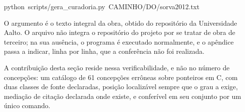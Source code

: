\begin{center}\small\ttfamily
python~scripts/gera\_curadoria.py~CAMINHO/DO/sorva2012.txt
\end{center}

O argumento é o texto integral da obra, obtido do repositório da Universidade Aalto. O arquivo não integra o repositório do projeto por se tratar de obra de terceiro; na sua ausência, o programa é executado normalmente, e o apêndice passa a indicar, linha por linha, que a conferência não foi realizada.

A contribuição desta seção reside nessa verificabilidade, e não no número de concepções: um catálogo de 61 concepções errôneas sobre ponteiros em C, com duas classes de fonte declaradas, posição localizável sempre que o grau a exige, mediação de citação declarada onde existe, e conferível em seu conjunto por um único comando.

